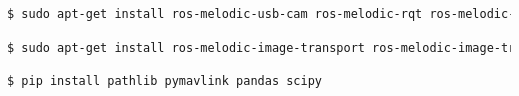 \documentclass[../Head/report.tex]{subfiles}
\begin{document}
\begin{lstlisting}[language=Bash,frame=none]
$ sudo apt-get install ros-melodic-usb-cam ros-melodic-rqt ros-melodic-rqt-common-plugins
\end{lstlisting}

\begin{lstlisting}[language=Bash,frame=none]
$ sudo apt-get install ros-melodic-image-transport ros-melodic-image-transport-plugins ros-melodic-image-transport-plugins ros-melodic-camera-info-manager
\end{lstlisting}

\begin{lstlisting}[language=Bash,frame=none]
$ pip install pathlib pymavlink pandas scipy
\end{lstlisting}
\end{document}
